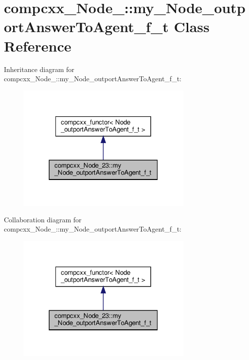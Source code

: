 \hypertarget{classcompcxx__Node__23_1_1my__Node__outportAnswerToAgent__f__t}{}\section{compcxx\+\_\+\+Node\+\_\+:\+:my\+\_\+\+Node\+\_\+outport\+Answer\+To\+Agent\+\_\+f\+\_\+t Class Reference}
\label{classcompcxx__Node__23_1_1my__Node__outportAnswerToAgent__f__t}


Inheritance diagram for compcxx\+\_\+\+Node\+\_\+:\+:my\+\_\+\+Node\+\_\+outport\+Answer\+To\+Agent\+\_\+f\+\_\+t\+:\nopagebreak
\begin{figure}[H]
\begin{center}
\leavevmode
\includegraphics[width=247pt]{classcompcxx__Node__23_1_1my__Node__outportAnswerToAgent__f__t__inherit__graph}
\end{center}
\end{figure}


Collaboration diagram for compcxx\+\_\+\+Node\+\_\+:\+:my\+\_\+\+Node\+\_\+outport\+Answer\+To\+Agent\+\_\+f\+\_\+t\+:\nopagebreak
\begin{figure}[H]
\begin{center}
\leavevmode
\includegraphics[width=247pt]{classcompcxx__Node__23_1_1my__Node__outportAnswerToAgent__f__t__coll__graph}
\end{center}
\end{figure}
